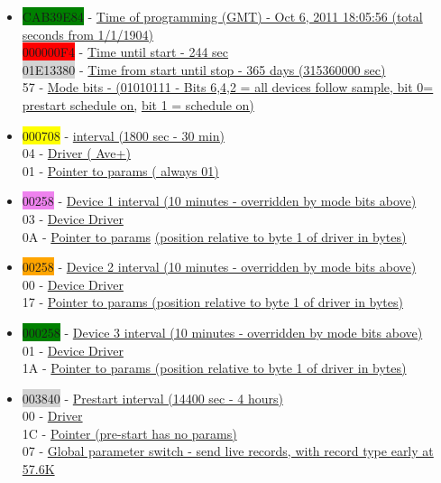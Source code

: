 \begin{itemize}
\item[]
\colorbox{green}{CAB39E84} - \underline{Time of programming (GMT) - Oct 6, 2011 18:05:56 (total seconds from 1/1/1904)}\\
\colorbox{red}{000000F4} - \underline{Time until start - 244 sec}\\
\colorbox{lightgray}{01E13380} - \underline{Time from start until stop - 365 days (315360000 sec)}\\
57 - \underline{Mode bits - (01010111 - Bits 6,4,2 = all devices follow \instType{}
sample, bit 0= prestart schedule on,} \linebreak \underline{bit 1 = \instType{} schedule on)}\\

\item[]
\colorbox{yellow}{000708} - \underline{\instType{} interval (1800 sec - 30 min)}\\
04 - \underline{\instType{} Driver (\dioxide{} Ave+)}\\
01 - \underline{Pointer to params (\instType{} always 01)}\\

\item[]
\colorbox{violet}{00258} - \underline{Device 1 interval (10 minutes - overridden by mode bits
above)}\\
03 - \underline{Device Driver}\\
0A - \underline{Pointer to params} \underline{(position relative to byte 1 of \instType{}
driver in bytes)}\\

\item[]
\colorbox{orange}{00258} - \underline{Device 2 interval (10 minutes - overridden by mode bits
above) }\\
00 - \underline{Device Driver}\\
17 - \underline{Pointer to params (position relative to byte 1 of \instType{} driver
in bytes)}\\

\item[]
\colorbox{green}{000258} - \underline{Device 3 interval (10 minutes - overridden by mode bits
above) }\\
01 - \underline{Device Driver}\\
1A - \underline{Pointer to params (position relative to byte 1 of \instType{} driver
in bytes) }\\

\item[]
\colorbox{lightgray}{003840} - \underline{Prestart interval (14400 sec - 4 hours)}\\
00 - \underline{Driver}\\
1C - \underline{Pointer (pre-start has no params)}\\
07 - \underline{Global parameter switch - send live records, with record type
early at 57.6K}
\end{itemize}


